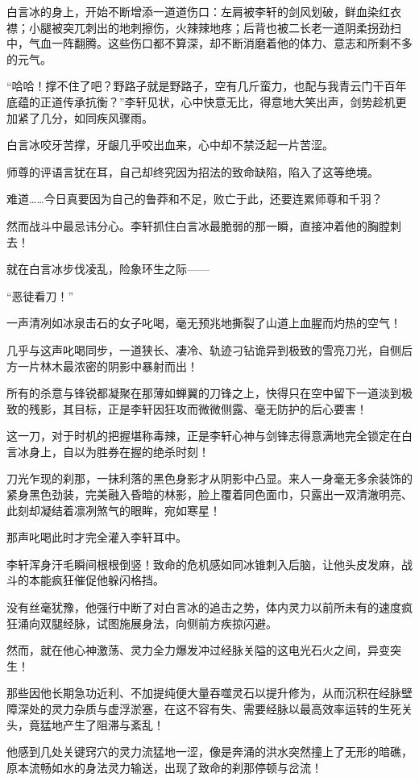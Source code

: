 白言冰的身上，开始不断增添一道道伤口：左肩被李轩的剑风划破，鲜血染红衣襟；小腿被突兀刺出的地刺擦伤，火辣辣地疼；后背也被二长老一道阴柔拐劲扫中，气血一阵翻腾。这些伤口都不算深，却不断消磨着他的体力、意志和所剩不多的元气。

“哈哈！撑不住了吧？野路子就是野路子，空有几斤蛮力，也配与我青云门干百年底蕴的正道传承抗衡？”李轩见状，心中快意无比，得意地大笑出声，剑势趁机更加紧了几分，如同疾风骤雨。

白言冰咬牙苦撑，牙龈几乎咬出血来，心中却不禁泛起一片苦涩。

师尊的评语言犹在耳，自己却终究因为招法的致命缺陷，陷入了这等绝境。

难道……今日真要因为自己的鲁莽和不足，败亡于此，还要连累师尊和千羽？

然而战斗中最忌讳分心。李轩抓住白言冰最脆弱的那一瞬，直接冲着他的胸膛刺去！

就在白言冰步伐凌乱，险象环生之际——

“恶徒看刀！”

一声清冽如冰泉击石的女子叱喝，毫无预兆地撕裂了山道上血腥而灼热的空气！

几乎与这声叱喝同步，一道狭长、凄冷、轨迹刁钻诡异到极致的雪亮刀光，自侧后方一片林木最浓密的阴影中暴射而出！

所有的杀意与锋锐都凝聚在那薄如蝉翼的刀锋之上，快得只在空中留下一道淡到极致的残影，其目标，正是李轩因狂攻而微微侧露、毫无防护的后心要害！

这一刀，对于时机的把握堪称毒辣，正是李轩心神与剑锋志得意满地完全锁定在白言冰身上，自以为胜券在握的绝杀时刻！

刀光乍现的刹那，一抹利落的黑色身影才从阴影中凸显。来人一身毫无多余装饰的紧身黑色劲装，完美融入昏暗的林影，脸上覆着同色面巾，只露出一双清澈明亮、此刻却凝结着凛冽煞气的眼眸，宛如寒星！

那声叱喝此时才完全灌入李轩耳中。

李轩浑身汗毛瞬间根根倒竖！致命的危机感如同冰锥刺入后脑，让他头皮发麻，战斗的本能疯狂催促他躲闪格挡。

没有丝毫犹豫，他强行中断了对白言冰的追击之势，体内灵力以前所未有的速度疯狂涌向双腿经脉，试图施展身法，向侧前方疾掠闪避。

然而，就在他心神激荡、灵力全力爆发冲过经脉关隘的这电光石火之间，异变突生！

那些因他长期急功近利、不加提纯便大量吞噬灵石以提升修为，从而沉积在经脉壁障深处的灵力杂质与虚浮淤塞，在这不容有失、需要经脉以最高效率运转的生死关头，竟猛地产生了阻滞与紊乱！

他感到几处关键窍穴的灵力流猛地一涩，像是奔涌的洪水突然撞上了无形的暗礁，原本流畅如水的身法灵力输送，出现了致命的刹那停顿与岔流！

